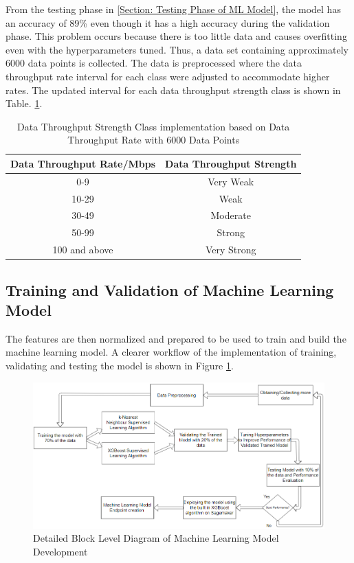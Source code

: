 From the testing phase in \ref{Section: Testing Phase of ML Model}, the model has an accuracy of 89\% even though it has a high accuracy during the validation phase. This problem occurs because there is too little data and causes overfitting even with the hyperparameters tuned. Thus, a data set containing approximately 6000 data points is collected. The data is preprocessed where the data throughput rate interval for each class were adjusted to accommodate higher rates. The updated interval for each data throughput strength class is shown in Table. \ref{table:class2}.
 
\begin{table}[ht]
\centering
\begin{center}
\begin{tabular}{ |c|c| } 
 \hline
 Data Throughput Rate/Mbps & Data Throughput Strength\\ 
  \hline\hline
0-9 & Very Weak\\ 
10-29 & Weak\\ 
30-49 & Moderate \\ 
50-99 & Strong\\ 
100 and above & Very Strong\\ 

 \hline
\end{tabular}
\caption{Data Throughput Strength Class implementation based on Data Throughput Rate with 6000 Data Points}
\label{table:class2}
\end{center}
\end{table}
 
\subsection{Training and Validation of Machine Learning Model} 
The features are then normalized and prepared to be used to train and build the machine learning model. A clearer workflow of the implementation of training, validating and testing the model is shown in Figure \ref{fig_mlmodel}.

\begin{figure} [ht]
    \centering
    \includegraphics[scale = 0.69]{pages/Chapter4/Chapter 4 Images/Work Flow.PNG}
    \caption{Detailed Block Level Diagram of Machine Learning Model Development}
    \label{fig_mlmodel}
\end{figure}

